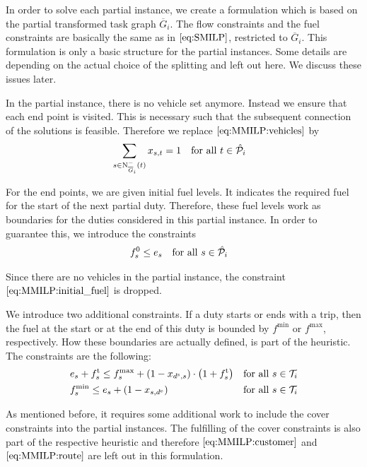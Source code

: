 In order to solve each partial instance, we create a formulation which is based on the partial transformed task graph $\overline{G}_i$. The flow constraints and the fuel constraints are basically the same as in $\eqref{eq:SMILP}$, restricted to $\overline{G}_i$. This formulation is only a basic structure for the partial instances. Some details are depending on the actual choice of the splitting and left out here. We discuss these issues later.

In the partial instance, there is no vehicle set anymore. Instead we ensure that each end point is visited. This is necessary such that the subsequent connection of the solutions is feasible. Therefore we replace $\eqref{eq:MMILP:vehicles}$ by
\begin{align}
	& \sum_{s\in\operatorname{N}_{\overline{G}_i}^-(t)} x_{s,t} = 1 && \text{for all } t\in\hat{\mathcal{P}}_i \label{eq:CMILP:start_end_points}
\end{align}

For the end points, we are given initial fuel levels. It indicates the required fuel for the start of the next partial duty. Therefore, these fuel levels work as boundaries for the duties considered in this partial instance. In order to guarantee this, we introduce the constraints
\begin{align}
	& f^0_s \leq e_s && \text{for all } s\in\hat{\mathcal{P}}_i \label{eq:CMILP:final_fuel}
\end{align}

Since there are no vehicles in the partial instance, the constraint $\eqref{eq:MMILP:initial_fuel}$ is dropped.

We introduce two additional constraints. If a duty starts or ends with a trip, then the fuel at the start or at the end of this duty is bounded by $f^{\min}$ or $f^{\max}$, respectively. How these boundaries are actually defined, is part of the heuristic. The constraints are the following:
\begin{align}
	& e_s + f^{\operatorname{t}}_s \leq f^{\max}_s + \left(1-x_{d^{\operatorname{s}},s}\right)\cdot\left(1+f^{\operatorname{t}}_s\right) && \text{for all } s\in\mathcal{T}_i \label{eq:CMILP:fmax} \\
	& f^{\min}_s \leq e_s + \left(1-x_{s,d^{\operatorname{e}}}\right) && \text{for all } s\in\mathcal{T}_i \label{eq:CMILP:fmin}
\end{align}

As mentioned before, it requires some additional work to include the cover constraints into the partial instances. The fulfilling of the cover constraints is also part of the respective heuristic and therefore $\eqref{eq:MMILP:customer}$ and $\eqref{eq:MMILP:route}$ are left out in this formulation.

